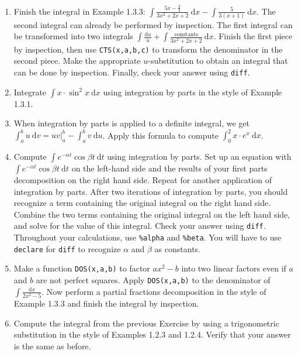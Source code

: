 \documentclass[10.5pt,twoside]{report}
\theoremstyle{definition}
\begin{document}
\begin{enumerate}
\item Finish the integral in Example 1.3.3:  $\displaystyle \int \frac{5x-\frac{2}{3}}{3x^2+2x+2}\ \mathrm{d}x-\displaystyle \int \frac{5}{3(x+1)}\ \mathrm{d}x$.  The second integral can already be performed by inspection.  The first integral can be transformed into two integrals $\displaystyle \int \frac{\mathrm{d}u}{u} + \displaystyle \int \frac{\mathrm{constants}}{3x^2+2x+2}\ \mathrm{d}x$.  Finish the first piece by inspection, then use \verb|CTS(x,a,b,c)| to transform the denominator in the second piece.  Make the appropriate $u$-substitution to obtain an integral that can be done by inspection.  Finally, check your answer using \verb|diff|.

\item Integrate $\displaystyle \int x\cdot \sin^2{x}\ \mathrm{d}x$ using integration by parts in the style of Example 1.3.1.

\item When integration by parts is applied to a definite integral, we get $\displaystyle \int_a^b u\ \mathrm{d}v = uv|_a^b - \displaystyle \int_a^b v\ \mathrm{d}u$.  Apply this formula to compute $\displaystyle \int_0^2 x\cdot e^x \ \mathrm{d}x$. 


\item Compute $\displaystyle \int e^{-\alpha t} \cos{\beta t}\ \mathrm{d} t$ using integration by parts.  Set up an equation with $\displaystyle \int e^{-\alpha t} \cos{\beta t}\ \mathrm{d} t$ on the left-hand side and the results of your first parts decomposition on the right hand side.  Repeat for another application of integration by parts.  After two iterations of integration by parts,  you should recognize a term containing the original integral on the right hand side.  Combine the two terms containing the original integral on the left hand side, and solve for the value of this integral.  Check your answer using \verb|diff|. Throughout your calculations, use \verb|%alpha| and \verb|%beta|.  You will have to use \verb|declare| for \verb|diff| to recognize $\alpha$ and $\beta$ as constants.

\item Make a function \verb|DOS(x,a,b)| to factor $ax^2-b$ into two linear factors even if $a$ and $b$ are not  perfect squares.  Apply \verb|DOS(x,a,b)| to the denominator of $\displaystyle \int \frac{\mathrm{d}x}{2x^2-5}$.  Now perform a partial fractions decomposition in the style of Example 1.3.3 and finish the integral by inspection.

\item Compute the integral from the previous Exercise by using a trigonometric substitution in the style of Examples 1.2.3 and 1.2.4.  Verify that your answer is the same as before.


\end{enumerate}
\end{document}
